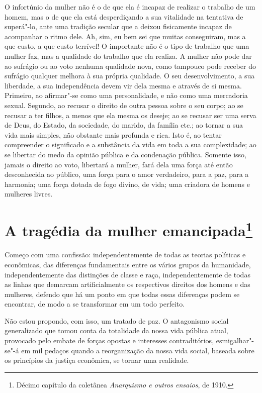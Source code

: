 O infortúnio da mulher não é o de que ela é incapaz de realizar o
trabalho de um homem, mas o de que ela está desperdiçando a sua
vitalidade na tentativa de superá"-lo, ante uma tradição secular que a\label{secular}
deixou fisicamente incapaz de acompanhar o ritmo dele. Ah, sim, eu bem
sei que muitas conseguiram, mas a que custo, a que custo terrível! O
importante não é o tipo de trabalho que uma mulher faz, mas a qualidade
do trabalho que ela realiza. A mulher não pode dar ao sufrágio ou ao
voto nenhuma qualidade nova, como tampouco pode receber do sufrágio
qualquer melhora à sua própria qualidade. O seu desenvolvimento, a sua
liberdade, a sua independência devem vir dela mesma e através de si
mesma. Primeiro, ao afirmar"-se como uma personalidade, e não como uma
mercadoria sexual. Segundo, ao recusar o direito de outra pessoa sobre o
seu corpo; ao se recusar a ter filhos, a menos que ela mesma os deseje;
ao se recusar ser uma serva de Deus, do Estado, da sociedade, do marido,
da família etc.; ao tornar a sua vida mais simples, não obstante mais
profunda e rica. Isto é, ao tentar compreender o significado e a substância
da vida em toda a sua complexidade; ao se libertar do medo da opinião
pública e da condenação pública. Somente isso, jamais o direito ao voto,
libertará a mulher, fará dela uma força até então desconhecida ao
público, uma força para o amor verdadeiro, para a paz, para a harmonia;
uma força dotada de fogo divino, de vida; uma criadora de homens e
mulheres livres.

\chapter{A tragédia da mulher emancipada\footnote{Décimo capítulo da coletânea
  \emph{Anarquismo e outros ensaios}, de 1910.}}

Começo com uma confissão: independentemente de todas as teorias
políticas e econômicas, das diferenças fundamentais entre os vários
grupos da humanidade, independentemente das distinções de classe e raça,
independentemente de todas as linhas que demarcam artificialmente os
respectivos direitos dos homens e das mulheres, defendo que há um ponto
em que todas essas diferenças podem se encontrar, de modo a se
transformar em um todo perfeito.\label{perfeito}

Não estou propondo, com isso, um tratado de paz. O antagonismo social
generalizado que tomou conta da totalidade da nossa vida pública atual,
provocado pelo embate de forças opostas e interesses contraditórios,
esmigalhar"-se"-á em mil pedaços quando a reorganização da nossa vida
social, baseada sobre os princípios da justiça econômica, se tornar uma
realidade.


